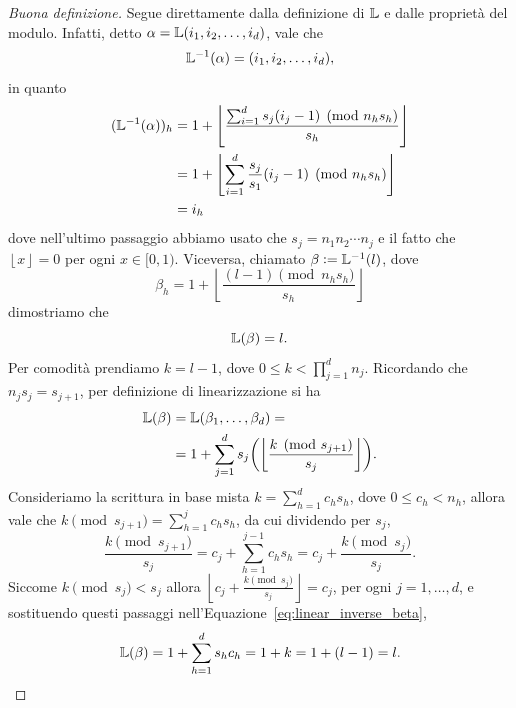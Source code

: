 \begin{proof}[Buona definizione]
	Segue direttamente dalla definizione di $ \mathbb{L} $ e dalle proprietà del modulo. Infatti, detto $
		\alpha = \L(\miwc) $, vale che
	\begin{equation*}
		\L^{-1}(\alpha) = (\miwc),
	\end{equation*}
	in quanto
	\[
		\begin{aligned}
			(\L^{-1}(\alpha))_{h}
			 & = 1+ \left\lfloor \frac{\sum_{i=1}^d s_j(i_j-1) \pmod{n_hs_h}}{s_h}
			\right\rfloor                                                          \\
			 & = 1+ \left\lfloor \sum_{i=1}^d \frac{s_j}{s_1}(i_j-1) \pmod{n_hs_h}
			\right\rfloor                                                          \\
			 & = i_{h}
		\end{aligned}
	\]
	dove nell'ultimo passaggio abbiamo usato che $ s_j = n_1 n_2\cdots n_{j}$ e il fatto che $
		\left\lfloor x \right\rfloor = 0 $ per ogni $ x \in [0,1) $.
	Viceversa, chiamato $ \beta \vcentcolon= \mathbb{L}^{-1}(l) $, dove
	\begin{equation*}
		\beta_{h} = 1 + \left\lfloor \frac{ (l-1)\pmod{n_hs_h}}{s_h}\right\rfloor
	\end{equation*}
	dimostriamo che
	\begin{equation*}
		\mathbb{L}(\beta) = l.
	\end{equation*}
	Per comodità prendiamo $ k = l-1 $, dove $ 0 \le k
		< \prod_{j=1}^d n_{j}$. Ricordando che $ n_{j}s_{j} = s_{j+1} $, per definizione di
	linearizzazione si ha
	\begin{align}
		\L(\beta) & = \L\left(\beta_1, \ldots, \beta_{d}\right) =  \notag                  \\
		          & =1 + \sum_{j = 1}^d s_j\left(\left\lfloor \frac{k \pmod{s_{j+1}}}{s_j}
		\right\rfloor \right).\label{eq:linear_inverse_beta}
	\end{align}
	Consideriamo la scrittura in base mista $ k = \sum_{h=1}^d c_{h}s_{h} $, dove $ 0 \le c_{h} <
		n_{h} $, allora vale che $ k \pmod{s_{j+1}} = \sum_{h=1}^j c_{h}s_{h} $, da cui dividendo per $
		s_{j}$,
	\begin{equation*}
		\frac{k \pmod{s_{j+1}}}{s_{j}} = c_{j} + \sum_{h=1}^{j-1} c_{h}s_{h} = c_{j} + \frac{k
			\pmod{s_{j}}}{s_{j}}.
	\end{equation*}
	Siccome $ k \pmod{s_{j}} < s_{j} $ allora $ \left\lfloor c_{j} + \frac{k \pmod{s_{j}}}{s_{j}}
		\right\rfloor = c_{j} $, per ogni $ j= 1,\ldots,d $, e sostituendo questi passaggi nell'Equazione~\eqref{eq:linear_inverse_beta},
	\begin{equation*}
		\mathbb{L}(\beta) = 1 + \sum_{h=1}^d s_{h}c_{h} = 1 + k = 1 + (l-1) = l.
	\end{equation*}
\end{proof}

